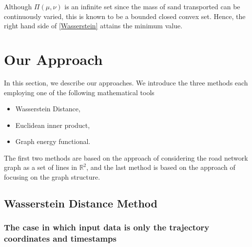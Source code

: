 \documentclass{article}
\numberwithin{equation}{section}
\theoremstyle{definition}
\newcommand{\R}{\mathbb{R}}
\begin{document}
Although $\Pi(\mu,\nu)$ is an infinite set since the mass of sand transported can be continuously varied, this is known to be a bounded closed convex set.
Hence, the right hand side of \eqref{Wasserstein} attains the minimum value.



\section{Our Approach}

In this section, we describe our approaches.
We introduce the three methods each employing one of the following mathematical tools
\begin{itemize}
    \item Wasserstein Distance,
    \item Euclidean inner product,
    \item Graph energy functional.
\end{itemize}
The first two methods are based on the approach of considering the road network graph as a set of lines in $\R^2$, and the last method is based on the approach of focusing on the graph structure.

\subsection{Wasserstein Distance Method}

\subsubsection*{The case in which input data is only the trajectory coordinates and timestamps} %
\end{document}
